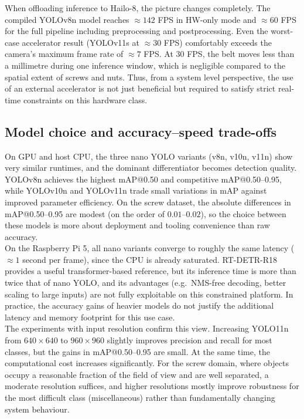 \documentclass[12pt,a4paper]{report}
\begin{document}
When offloading inference to Hailo-8, the picture changes completely.
The compiled YOLOv8n model reaches \(\approx 142\) FPS in HW-only mode and
\(\approx 60\) FPS for the full pipeline including preprocessing and postprocessing.
Even the worst-case accelerator result (YOLOv11s at \(\approx 30\) FPS) comfortably
exceeds the camera’s maximum frame rate of \(\approx 7\) FPS.
At 30 FPS, the belt moves less than a millimetre during one inference window,
which is negligible compared to the spatial extent of screws and nuts.
Thus, from a system level perspective, the use of an external accelerator is not just
beneficial but required to satisfy strict real-time constraints on this hardware class. \\

\subsection{Model choice and accuracy–speed trade-offs}

On GPU and host CPU, the three nano YOLO variants (v8n, v10n, v11n) show very similar
runtimes, and the dominant differentiator becomes detection quality.
YOLOv8n achieves the highest mAP@0.50 and competitive mAP@0.50–0.95, while
YOLOv10n and YOLOv11n trade small variations in mAP against improved parameter efficiency.
On the screw dataset, the absolute differences in mAP@0.50–0.95 are modest
(on the order of \(0.01\)–\(0.02\)), so the choice between these models is more
about deployment and tooling convenience than raw accuracy. \\

On the Raspberry Pi 5, all nano variants converge to roughly the same latency (\(\approx 1\)
second per frame), since the CPU is already saturated.
RT-DETR-R18 provides a useful transformer-based reference, but its inference time is more than
twice that of nano YOLO, and its advantages (e.g.\ NMS-free decoding, better scaling to large
inputs) are not fully exploitable on this constrained platform.
In practice, the accuracy gains of heavier models do not justify the additional latency
and memory footprint for this use case. \\

The experiments with input resolution confirm this view.
Increasing YOLO11n from \(640\times640\) to \(960\times960\) slightly improves precision and
recall for most classes, but the gains in mAP@0.50–0.95 are small.
At the same time, the computational cost increases significantly.
For the screw domain, where objects occupy a reasonable fraction of the field of view and
are well separated, a moderate resolution suffices, and higher resolutions mostly improve
robustness for the most difficult class (miscellaneous) rather than fundamentally
changing system behaviour. \\
\end{document}
